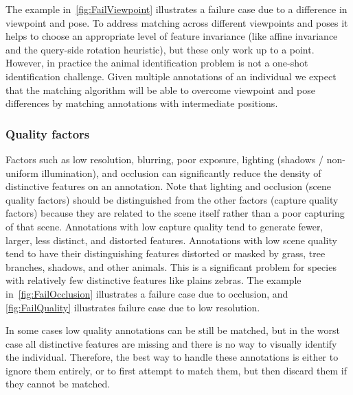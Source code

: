             The example in~\cref{fig:FailViewpoint} illustrates a failure case due to a difference in viewpoint
              and pose.
            To address matching across different viewpoints and poses it helps to choose an appropriate level of
              feature invariance (like affine invariance and the query-side rotation heuristic), but these only
              work up to a point.
            However, in practice the animal identification problem is not a one-shot identification challenge.
            Given multiple annotations of an individual we expect that the matching algorithm will be able to
              overcome viewpoint and pose differences by matching annotations with intermediate positions.

        \subsubsection{Quality factors}
            Factors such as low resolution, blurring, poor exposure, lighting (shadows / non-uniform
              illumination), and occlusion can significantly reduce the density of distinctive features on an
              annotation.
            Note that lighting and occlusion (scene quality factors) should be distinguished from the other
              factors (capture quality factors) because they are related to the scene itself rather than a poor
              capturing of that scene.
            Annotations with low capture quality tend to generate fewer, larger, less distinct, and distorted
              features.
            Annotations with low scene quality tend to have their distinguishing features distorted or masked by
              grass, tree branches, shadows, and other animals.
            This is a significant problem for species with relatively few distinctive features like plains
              zebras.
            The example in~\cref{fig:FailOcclusion} illustrates a failure case due to occlusion, and
              \cref{fig:FailQuality} illustrates failure case due to low resolution.

            \FailOcclusion{}
            \FailQuality{}

            In some cases low quality annotations can be still be matched, but in the worst case all distinctive
              features are missing and there is no way to visually identify the individual.
            Therefore, the best way to handle these annotations is either to ignore them entirely, or to first
              attempt to match them, but then discard them if they cannot be matched.


